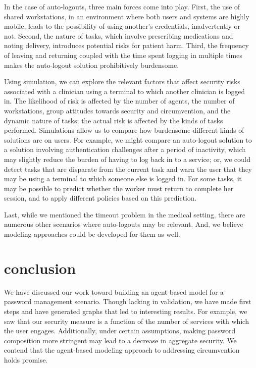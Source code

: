 \documentclass[conference]{IEEEtran}
\begin{document}
{In the case of auto-logouts, three main forces come into play. 
First, the use of shared workstations, in an environment where 
both users and systems are highly mobile, leads to the 
possibility of using another's credentials, inadvertently or not. 
Second, the nature of tasks, which involve prescribing 
medications and noting delivery, introduces potential risks 
for patient harm. Third, the frequency of leaving and returning 
coupled with the time spent logging in multiple times makes the 
auto-logout solution prohibitively burdensome.

Using simulation, we can explore the relevant factors that 
affect security risks associated with a clinician using a terminal to 
which another clinician is logged in. The likelihood of risk is 
affected by the number of agents, the number of workstations, 
group attitudes towards security and circumvention, and the 
dynamic nature of tasks; the actual risk is affected 
by the kinds of tasks performed. Simulations 
allow us to compare how burdensome different kinds of solutions 
are on users. For example, we might compare an auto-logout 
solution to a solution involving authentication challenges after a 
period of inactivity, which may slightly reduce the burden of 
having to log back in to a service; or, we could detect tasks that 
are disparate from the current task and warn the user that they 
may be using a terminal to which someone else is logged in. 
For some tasks, it may be possible to predict whether 
the worker must return to complete her session, and to apply 
different policies based on this prediction.

Last, while we mentioned the timeout problem in the medical 
setting, there are numerous other scenarios where auto-logouts 
may be relevant. And, we believe modeling approaches could 
be developed for them as well.

\section{conclusion}
\label{conclusion}

We have discussed our work toward building an agent-based model 
for a password management scenario. Though lacking in validation, 
we have made first steps and have generated graphs that led to 
interesting results. For example, we saw that our security measure 
is a function of the number of services with which the user engages. 
Additionally, under certain assumptions, making password composition 
more stringent may lead to a decrease in aggregate security. We contend 
that the agent-based modeling approach to addressing circumvention 
holds promise.

}
\end{document}
